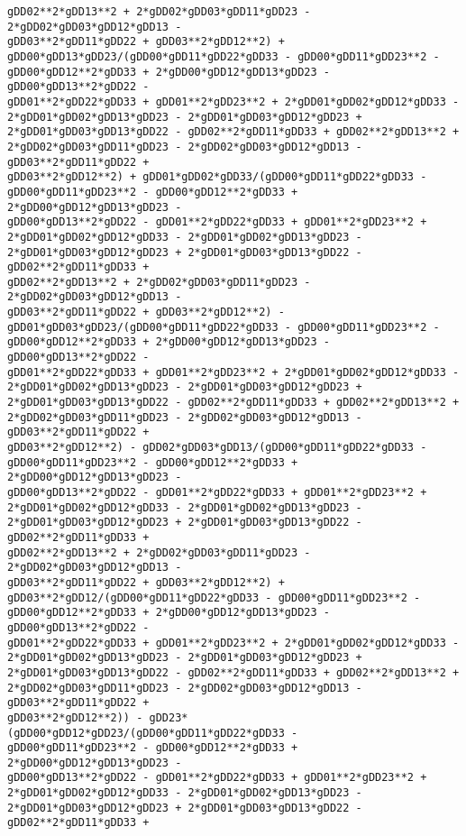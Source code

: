\documentclass[landscape,letterpaper,10pt,english]{article}
\begin{document}
\begin{Verbatim}[commandchars=\\\{\}]
gDD02**2*gDD13**2 + 2*gDD02*gDD03*gDD11*gDD23 - 2*gDD02*gDD03*gDD12*gDD13 -
gDD03**2*gDD11*gDD22 + gDD03**2*gDD12**2) +
gDD00*gDD13*gDD23/(gDD00*gDD11*gDD22*gDD33 - gDD00*gDD11*gDD23**2 -
gDD00*gDD12**2*gDD33 + 2*gDD00*gDD12*gDD13*gDD23 - gDD00*gDD13**2*gDD22 -
gDD01**2*gDD22*gDD33 + gDD01**2*gDD23**2 + 2*gDD01*gDD02*gDD12*gDD33 -
2*gDD01*gDD02*gDD13*gDD23 - 2*gDD01*gDD03*gDD12*gDD23 +
2*gDD01*gDD03*gDD13*gDD22 - gDD02**2*gDD11*gDD33 + gDD02**2*gDD13**2 +
2*gDD02*gDD03*gDD11*gDD23 - 2*gDD02*gDD03*gDD12*gDD13 - gDD03**2*gDD11*gDD22 +
gDD03**2*gDD12**2) + gDD01*gDD02*gDD33/(gDD00*gDD11*gDD22*gDD33 -
gDD00*gDD11*gDD23**2 - gDD00*gDD12**2*gDD33 + 2*gDD00*gDD12*gDD13*gDD23 -
gDD00*gDD13**2*gDD22 - gDD01**2*gDD22*gDD33 + gDD01**2*gDD23**2 +
2*gDD01*gDD02*gDD12*gDD33 - 2*gDD01*gDD02*gDD13*gDD23 -
2*gDD01*gDD03*gDD12*gDD23 + 2*gDD01*gDD03*gDD13*gDD22 - gDD02**2*gDD11*gDD33 +
gDD02**2*gDD13**2 + 2*gDD02*gDD03*gDD11*gDD23 - 2*gDD02*gDD03*gDD12*gDD13 -
gDD03**2*gDD11*gDD22 + gDD03**2*gDD12**2) -
gDD01*gDD03*gDD23/(gDD00*gDD11*gDD22*gDD33 - gDD00*gDD11*gDD23**2 -
gDD00*gDD12**2*gDD33 + 2*gDD00*gDD12*gDD13*gDD23 - gDD00*gDD13**2*gDD22 -
gDD01**2*gDD22*gDD33 + gDD01**2*gDD23**2 + 2*gDD01*gDD02*gDD12*gDD33 -
2*gDD01*gDD02*gDD13*gDD23 - 2*gDD01*gDD03*gDD12*gDD23 +
2*gDD01*gDD03*gDD13*gDD22 - gDD02**2*gDD11*gDD33 + gDD02**2*gDD13**2 +
2*gDD02*gDD03*gDD11*gDD23 - 2*gDD02*gDD03*gDD12*gDD13 - gDD03**2*gDD11*gDD22 +
gDD03**2*gDD12**2) - gDD02*gDD03*gDD13/(gDD00*gDD11*gDD22*gDD33 -
gDD00*gDD11*gDD23**2 - gDD00*gDD12**2*gDD33 + 2*gDD00*gDD12*gDD13*gDD23 -
gDD00*gDD13**2*gDD22 - gDD01**2*gDD22*gDD33 + gDD01**2*gDD23**2 +
2*gDD01*gDD02*gDD12*gDD33 - 2*gDD01*gDD02*gDD13*gDD23 -
2*gDD01*gDD03*gDD12*gDD23 + 2*gDD01*gDD03*gDD13*gDD22 - gDD02**2*gDD11*gDD33 +
gDD02**2*gDD13**2 + 2*gDD02*gDD03*gDD11*gDD23 - 2*gDD02*gDD03*gDD12*gDD13 -
gDD03**2*gDD11*gDD22 + gDD03**2*gDD12**2) +
gDD03**2*gDD12/(gDD00*gDD11*gDD22*gDD33 - gDD00*gDD11*gDD23**2 -
gDD00*gDD12**2*gDD33 + 2*gDD00*gDD12*gDD13*gDD23 - gDD00*gDD13**2*gDD22 -
gDD01**2*gDD22*gDD33 + gDD01**2*gDD23**2 + 2*gDD01*gDD02*gDD12*gDD33 -
2*gDD01*gDD02*gDD13*gDD23 - 2*gDD01*gDD03*gDD12*gDD23 +
2*gDD01*gDD03*gDD13*gDD22 - gDD02**2*gDD11*gDD33 + gDD02**2*gDD13**2 +
2*gDD02*gDD03*gDD11*gDD23 - 2*gDD02*gDD03*gDD12*gDD13 - gDD03**2*gDD11*gDD22 +
gDD03**2*gDD12**2)) - gDD23*(gDD00*gDD12*gDD23/(gDD00*gDD11*gDD22*gDD33 -
gDD00*gDD11*gDD23**2 - gDD00*gDD12**2*gDD33 + 2*gDD00*gDD12*gDD13*gDD23 -
gDD00*gDD13**2*gDD22 - gDD01**2*gDD22*gDD33 + gDD01**2*gDD23**2 +
2*gDD01*gDD02*gDD12*gDD33 - 2*gDD01*gDD02*gDD13*gDD23 -
2*gDD01*gDD03*gDD12*gDD23 + 2*gDD01*gDD03*gDD13*gDD22 - gDD02**2*gDD11*gDD33 +

\end{Verbatim}
\end{document}
